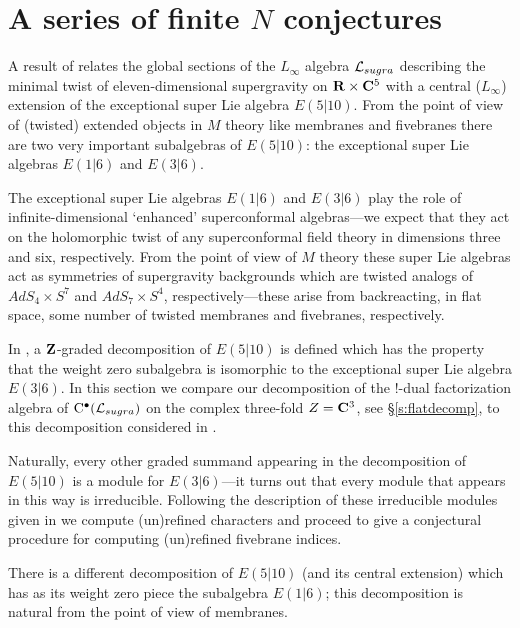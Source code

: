 \documentclass[11pt]{amsart}
\begin{document}
\section{A series of finite $N$ conjectures}

A result of \cite{RSW} relates the global sections of the $L_\infty$ algebra $\mathcal L_{sugra}$ describing the minimal twist of eleven-dimensional supergravity on $\mathbf{R} \times \mathbf{C}^5$ with a central ($L_\infty$) extension of the exceptional super Lie algebra $E(5|10)$.
From the point of view of (twisted) extended objects in $M$ theory like membranes and fivebranes there are two very important subalgebras of $E(5|10)$: the exceptional super Lie algebras $E(1|6)$ and $E(3|6)$. 

The exceptional super Lie algebras $E(1|6)$ and $E(3|6)$ play the role of infinite-dimensional `enhanced' superconformal algebras---we expect that they act on the holomorphic twist of any superconformal field theory in dimensions three and six, respectively.
From the point of view of $M$ theory these super Lie algebras act as symmetries of supergravity backgrounds which are twisted analogs of $AdS_4 \times S^7$ and $AdS_7 \times S^4$, respectively---these arise from backreacting, in flat space, some number of twisted membranes and fivebranes, respectively. 

In \cite{KR1}, a $\mathbf{Z}$-graded decomposition of $E(5|10)$ is defined which has the property that the weight zero subalgebra is isomorphic to the exceptional super Lie algebra $E(3|6)$.
In this section we compare our decomposition of the $!$-dual factorization algebra of ${\rm C}^\bullet(\mathcal L_{sugra})$ on the complex three-fold $Z = \mathbf{C}^3$, see \S \ref{s:flatdecomp}, to this decomposition considered in \cite{KR1}.

Naturally, every other graded summand appearing in the decomposition of $E(5|10)$ is a module for $E(3|6)$---it turns out that every module that appears in this way is irreducible.
Following the description of these irreducible modules given in \cite{KR1,KR2} we compute (un)refined characters and proceed to give a conjectural procedure for computing (un)refined fivebrane indices.

There is a different decomposition of $E(5|10)$ (and its central extension) which has as its weight zero piece the subalgebra $E(1|6)$; this decomposition is natural from the point of view of membranes. 


\end{document}
